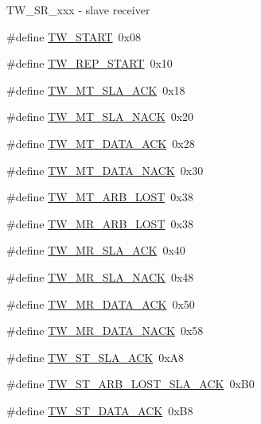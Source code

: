 T\+W\+\_\+\+S\+R\+\_\+xxx -\/ slave receiver \begin{DoxyCompactItemize}
\item 
\#define \hyperlink{group__util__twi_ga8ec630c2063d0353c53d140b99382d80}{T\+W\+\_\+\+S\+T\+A\+RT}~0x08
\item 
\#define \hyperlink{group__util__twi_ga8dce3e4b7e35355a8add9ed63d1fa3ab}{T\+W\+\_\+\+R\+E\+P\+\_\+\+S\+T\+A\+RT}~0x10
\item 
\#define \hyperlink{group__util__twi_ga85cae14b4190042335d25ed9a1b72369}{T\+W\+\_\+\+M\+T\+\_\+\+S\+L\+A\+\_\+\+A\+CK}~0x18
\item 
\#define \hyperlink{group__util__twi_gaca64b973c51d6548a962c1d7cae0663e}{T\+W\+\_\+\+M\+T\+\_\+\+S\+L\+A\+\_\+\+N\+A\+CK}~0x20
\item 
\#define \hyperlink{group__util__twi_ga4c28186053b5298305b131ad3e1111f7}{T\+W\+\_\+\+M\+T\+\_\+\+D\+A\+T\+A\+\_\+\+A\+CK}~0x28
\item 
\#define \hyperlink{group__util__twi_ga91c107a74d268f8578d866ed1bbbd4f3}{T\+W\+\_\+\+M\+T\+\_\+\+D\+A\+T\+A\+\_\+\+N\+A\+CK}~0x30
\item 
\#define \hyperlink{group__util__twi_ga5959251c4bd80f48b5a029447d86adb3}{T\+W\+\_\+\+M\+T\+\_\+\+A\+R\+B\+\_\+\+L\+O\+ST}~0x38
\item 
\#define \hyperlink{group__util__twi_gad85222308836bfbe099255662ffb510c}{T\+W\+\_\+\+M\+R\+\_\+\+A\+R\+B\+\_\+\+L\+O\+ST}~0x38
\item 
\#define \hyperlink{group__util__twi_gac16504b87d15d83b97bb0ce61577bb40}{T\+W\+\_\+\+M\+R\+\_\+\+S\+L\+A\+\_\+\+A\+CK}~0x40
\item 
\#define \hyperlink{group__util__twi_ga655325b6f8a1818103b126cc3774d8e8}{T\+W\+\_\+\+M\+R\+\_\+\+S\+L\+A\+\_\+\+N\+A\+CK}~0x48
\item 
\#define \hyperlink{group__util__twi_ga3c8c79b2ecb8d22358839890161cc33b}{T\+W\+\_\+\+M\+R\+\_\+\+D\+A\+T\+A\+\_\+\+A\+CK}~0x50
\item 
\#define \hyperlink{group__util__twi_ga532f0ffa12f684346c74a5cbec15950e}{T\+W\+\_\+\+M\+R\+\_\+\+D\+A\+T\+A\+\_\+\+N\+A\+CK}~0x58
\item 
\#define \hyperlink{group__util__twi_ga0ecd2ca38d00279194460e65028a0533}{T\+W\+\_\+\+S\+T\+\_\+\+S\+L\+A\+\_\+\+A\+CK}~0x\+A8
\item 
\#define \hyperlink{group__util__twi_ga1064659d0758206d43d69cd582d1f5da}{T\+W\+\_\+\+S\+T\+\_\+\+A\+R\+B\+\_\+\+L\+O\+S\+T\+\_\+\+S\+L\+A\+\_\+\+A\+CK}~0x\+B0
\item 
\#define \hyperlink{group__util__twi_ga2de84bf7cbf1cd7ae43a6e0f0eeca719}{T\+W\+\_\+\+S\+T\+\_\+\+D\+A\+T\+A\+\_\+\+A\+CK}~0x\+B8

\end{DoxyCompactItemize}
